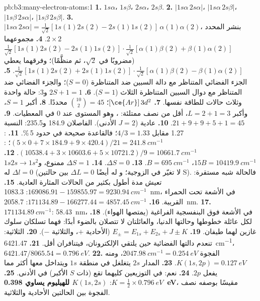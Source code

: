 \begin{solution}{pb:b3:many-electron-atoms:1}
\textbf{1.} $1s\alpha$، $1s\beta$، $2s\alpha$، $2s\beta$.
\textbf{2.} $|1s\alpha\,2s\alpha|$، $|1s\alpha\,2s\beta|$، $|1s\beta\,2s\alpha|$،
$|1s\beta\,2s\beta|$.
\textbf{3.} $|1s\alpha\,2s\alpha| = \frac{1}{\sqrt2}[1s(1)2s(2) - 2s(1)1s(2)]\,
\alpha(1)\alpha(2)$، بنشر المحدد $2\times2$.
\textbf{4.} مجموعهما $\frac{1}{\sqrt2}[1s(1)2s(2) - 2s(1)1s(2)]\cdot
\frac{1}{\sqrt2}[\alpha(1)\beta(2) + \beta(1)\alpha(2)]$ (مضروبًا في $\sqrt2$، ثم
منظَّمًا)؛ وفرقهما يعطي $\frac{1}{\sqrt2}[1s(1)2s(2) +
2s(1)1s(2)]\cdot\frac{1}{\sqrt2}[\alpha(1)\beta(2) - \beta(1)\alpha(2)]$.
\textbf{5.} الجزء الفضائي المتناظر مع دالة السبين ضد المتناظرة ($S = 0$)؛
والجزء الفضائي ضد المتناظر مع دوال السبين المتناظرة الثلاث ($S = 1$).
\textbf{6.} $2S + 1 = 1$ و3: حالة واحدة وثلاث حالات للطاقة نفسها.
\textbf{7.} $[\ce{Ar}]\,3d^2$؛ $\binom{10}{2} = 45$ محددًا.
\textbf{8.} أكبر $S = 1$، وأكبر $L = 2 + 1 = 3$، أقل من نصف ممتلئة:
، وهو المستوى عند 0 في المعطيات.
\textbf{9.} $21 + 9 + 9 + 5 + 1 = 45$.
\textbf{10.} عادية ($J = 2$ الأدنى). الفاصلان 184.9 و235.5: النسبة 1.27
مقابل $4/3 = 1.33$؛ فالقاعدة صحيحة في حدود 5\,\%.
\textbf{11.} : $(5 \times 0 + 7 \times 184.9 + 9 \times 420.4)/21 =
\qty{241.8}{cm^{-1}}$؛ : $(10538.4 + 3 \times 10603.6 + 5 \times
10721.2)/9 = \qty{10661.7}{cm^{-1}}$.
\textbf{12.} $15B = \qty{10419.9}{cm^{-1}}$، $B = \qty{695}{cm^{-1}}$.
\textbf{13.} $\Delta S = 0$.
\textbf{14.} $\Delta S = 1$ ممنوع، و$1s2s \to 1s^2$ له $\Delta l = 0$
(لا تغيّر في الزوجية؛ و له أيضًا $\Delta L = 0$ بين حالتين
S). فالحالة شبه مستقرة: تعيش مدة أطول بكثير من الحالات المثارة
العادية.
\textbf{15.} $169086.91 - 159855.97 = \qty{9230.94}{cm^{-1}}$: \qty{1083.3}{nm}، في
الأشعة تحت الحمراء القريبة.
\textbf{16.} $171134.89 - 166277.44 = \qty{4857.45}{cm^{-1}}$: \qty{2058.7}{nm}.
\textbf{17.} $\qty{171134.89}{cm^{-1}}$: \qty{58.43}{nm}، في الأشعة فوق البنفسجية
الفراغية (يمتصها الهواء).
\textbf{18.} لكل عائلة خطوطها وحالتها الدنيا، 
والعائلتان لا تتصلان بالضوء أبدًا: فهما تسلكان سلوك غازين لهما طيفان.
\textbf{19.} $E_\pm = E_{1s} + E_{2s} + J \pm K$ (الأحادية $+$، والثلاثية $-$).
\textbf{20.} الثلاثية: تنعدم دالتها الفضائية حين يلتقي الإلكترونان،
فيتنافران أقل.
\textbf{21.} \qty{6421.47}{cm^{-1}}، $6421.47/8065.54 = \qty{0.796}{eV}$.
\textbf{22.} الفجوة $\qty{2047.98}{cm^{-1}} = \qty{0.254}{eV}$، ومنه $K(1s,2p) =
\qty{0.127}{eV}$.
\textbf{23.} المدار $2s$ يتغلغل في منطقة $1s$ ويتداخل معها أكثر مما يفعل
$2p$.
\textbf{24.} نعم: في التوزيعين كليهما تقع  (ذات $S$ الأكبر) في الأدنى.
\textbf{25.} $K = \frac12 \times \qty{0.796}{eV}$: \textbf{
$K(1s,2s)$ للهيليوم يساوي \qty{0.398}{eV}}، مقيسًا بوصفه نصف
الفجوة بين الحالتين الأحادية والثلاثية.
\end{solution}
